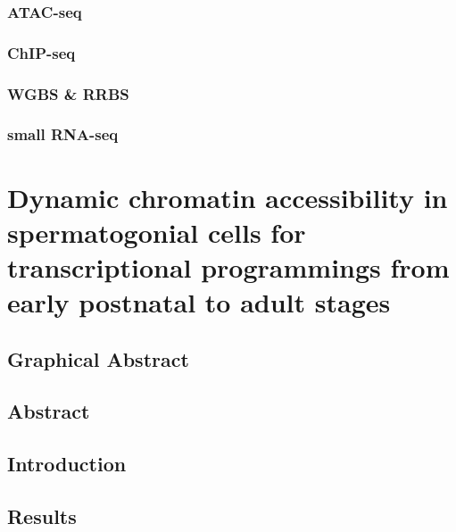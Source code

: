 \documentclass[12pt,twoside]{reedthesis}
\begin{document}
\hypertarget{atac-seq}{%
\subsection{ATAC-seq}\label{atac-seq}}

\hypertarget{chip-seq}{%
\subsection{ChIP-seq}\label{chip-seq}}

\hypertarget{wgbs-rrbs}{%
\subsection{WGBS \& RRBS}\label{wgbs-rrbs}}

\hypertarget{small-rna-seq}{%
\subsection{small RNA-seq}\label{small-rna-seq}}

\hypertarget{developmental}{%
\chapter{Dynamic chromatin accessibility in spermatogonial cells for transcriptional programmings from early postnatal to adult stages}\label{developmental}}

\newpage

\hypertarget{graphical-abstract}{%
\section{Graphical Abstract}\label{graphical-abstract}}

\newpage

\hypertarget{abstract-1}{%
\section{Abstract}\label{abstract-1}}

\newpage

\hypertarget{introduction}{%
\section{Introduction}\label{introduction}}

\newpage

\hypertarget{results}{%
\section{Results}\label{results}}
\end{document}
